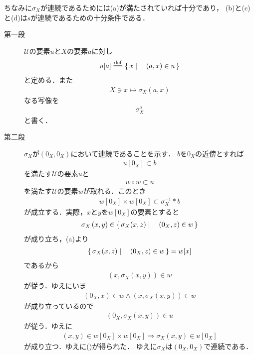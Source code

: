 	ちなみに$\sigma_X$が連続であるためには(a)が満たされていれば十分であり，
	(b)と(c)と(d)は$s$が連続であるための十分条件である．
	
	\begin{sketch}\mbox{}
		\begin{description}
			\item[第一段] $\mathscr{U}$の要素$u$と$X$の要素$a$に対し
				\begin{align}
					u[a] \defeq \Set{x}{(a,x) \in u}
				\end{align}
				と定める．また
				\begin{align}
					X \ni x \longmapsto \sigma_X(a,x)
				\end{align}
				なる写像を
				\begin{align}
					\sigma_X^a
				\end{align}
				と書く．
				
			\item[第二段]
				$\sigma_X$が$\left(0_X,0_X\right)$において連続であることを示す．
				$b$を$0_X$の近傍とすれば
				\begin{align}
					u[0_X] \subset b
				\end{align}
				を満たす$\mathscr{U}$の要素$u$と
				\begin{align}
					w \circ w \subset u
				\end{align}
				を満たす$\mathscr{U}$の要素$w$が取れる．このとき
				\begin{align}
					w[0_X] \times w[0_X] \subset \sigma_X^{-1} \ast b
					\label{fom:thm_entourages_introducing_vector_topology_1}
				\end{align}
				が成立する．実際，$x$と$y$を$w[0_X]$の要素とすると
				\begin{align}
					\sigma_X\left(x,y\right) \in \left\{\, \sigma_X(x,z) \mid \quad (0_X,z) \in w\, \right\}
				\end{align}
				が成り立ち，(a)より
				\begin{align}
					\left\{\, \sigma_X(x,z) \mid \quad (0_X,z) \in w\, \right\} = w[x]
				\end{align}
				であるから
				\begin{align}
					\left(x,\sigma_X\left(x,y\right)\right) \in w
				\end{align}
				が従う．ゆえにいま
				\begin{align}
					(0_X,x) \in w \wedge \left(x,\sigma_X\left(x,y\right)\right) \in w
				\end{align}
				が成り立っているので
				\begin{align}
					\left(0_X,\sigma_X\left(x,y\right)\right) \in u
				\end{align}
				が従う．ゆえに
				\begin{align}
					\left(x,y\right) \in w[0_X] \times w[0_X] \Longrightarrow
					\sigma_X\left(x,y\right) \in u[0_X]
				\end{align}
				が成り立つ．ゆえに()が得られた．
				ゆえに$\sigma_X$は$\left(0_X,0_X\right)$で連続である．
				

\end{description}
\end{sketch}

